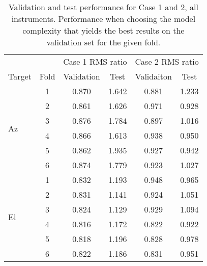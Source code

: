 \begin{table}
    \centering
    \caption{Validation and test performance for Case 1 and 2, all instruments.
    Performance when choosing the model complexity that yields the best results on the validation set for the given fold.}
    \begin{tabular}{lccccc}
        \toprule
        & & \multicolumn{2}{c}{Case 1 RMS ratio} & \multicolumn{2}{c}{Case 2 RMS ratio} \\
        \cmidrule{3-4} \cmidrule{5-6}
        Target & Fold & Validation & Test &  Validaiton &  Test \\
        \midrule
        \multirow{6}{*}{Az} & 1 &  0.870 &       1.642 &      0.881 &       1.233 \\
                            & 2 &  0.861 &       1.626 &      0.971 &       0.928 \\
                            & 3 &  0.876 &       1.784 &      0.897 &       1.016 \\
                            & 4 &  0.866 &       1.613 &      0.938 &       0.950 \\
                            & 5 &  0.862 &       1.935 &      0.927 &       0.942 \\
                            & 6 &  0.874 &       1.779 &      0.923 &       1.027 \\
                            \hline
        \multirow{6}{*}{El} & 1 &  0.832 &       1.193 &      0.948 &       0.965 \\
        & 2 &  0.831 &       1.141 &      0.924 &       1.051 \\
                            & 3 &  0.824 &       1.129 &      0.929 &       1.094 \\
                            & 4 &  0.816 &       1.172 &      0.822 &       0.922 \\
                            & 5 &  0.818 &       1.196 &      0.828 &       0.978 \\
                            & 6 &  0.822 &       1.186 &      0.831 &       0.951 \\
                            \bottomrule
    \end{tabular}
    \label{tab:results_minval_val_test_days_04_all}
\end{table}

